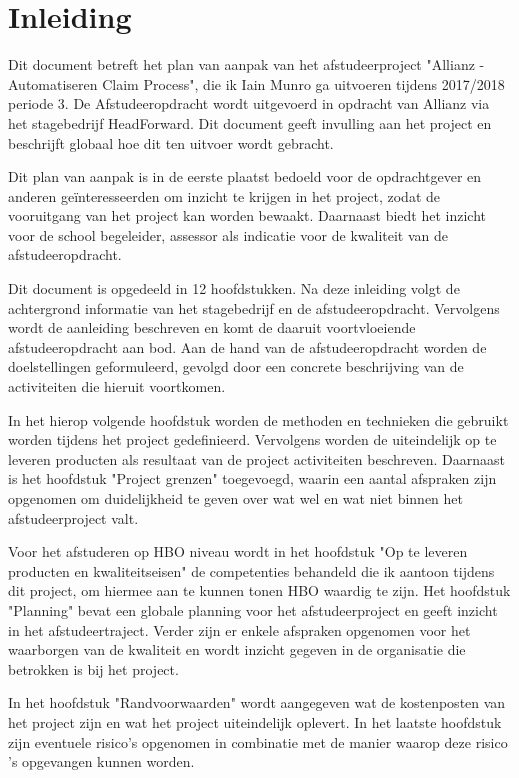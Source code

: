 \chapter{Inleiding}
Dit document betreft het plan van aanpak van het afstudeerproject "Allianz - Automatiseren Claim Process", die ik Iain Munro ga uitvoeren tijdens 2017/2018 periode 3. De Afstudeeropdracht wordt uitgevoerd in opdracht van Allianz via het stagebedrijf HeadForward. Dit document geeft invulling aan het project en beschrijft globaal hoe dit ten uitvoer wordt gebracht.

Dit plan van aanpak is in de eerste plaatst bedoeld voor de opdrachtgever en anderen geïnteresseerden om inzicht te krijgen in het project, zodat de vooruitgang van het project kan worden bewaakt. Daarnaast biedt het inzicht voor de school begeleider, assessor als indicatie voor de kwaliteit van de afstudeeropdracht.

Dit document is opgedeeld in 12 hoofdstukken. Na deze inleiding volgt de achtergrond informatie van het stagebedrijf en de afstudeeropdracht. Vervolgens wordt de aanleiding beschreven en komt de daaruit voortvloeiende afstudeeropdracht aan bod. Aan de hand van de afstudeeropdracht worden de doelstellingen geformuleerd, gevolgd door een concrete beschrijving van de activiteiten die hieruit voortkomen.

In het hierop volgende hoofdstuk worden de methoden en technieken die gebruikt worden tijdens het project gedefinieerd. Vervolgens worden de uiteindelijk op te leveren producten als resultaat van de project activiteiten beschreven. Daarnaast is het hoofdstuk "Project grenzen" toegevoegd, waarin een aantal afspraken zijn opgenomen om duidelijkheid te geven over wat wel en wat niet binnen het afstudeerproject valt.

Voor het afstuderen op HBO niveau wordt in het hoofdstuk "Op te leveren producten en kwaliteitseisen" de competenties behandeld die ik aantoon tijdens dit project, om hiermee aan te kunnen tonen HBO waardig te zijn. Het hoofdstuk "Planning" bevat een globale planning voor het afstudeerproject en geeft inzicht in het afstudeertraject. Verder zijn er enkele afspraken opgenomen voor het waarborgen van de kwaliteit en wordt inzicht gegeven in de organisatie die betrokken is bij het project.

In het hoofdstuk "Randvoorwaarden" wordt aangegeven wat de kostenposten van het project zijn en wat het project uiteindelijk oplevert. In het laatste hoofdstuk zijn eventuele risico's opgenomen in combinatie met de manier waarop deze risico 's opgevangen kunnen worden.